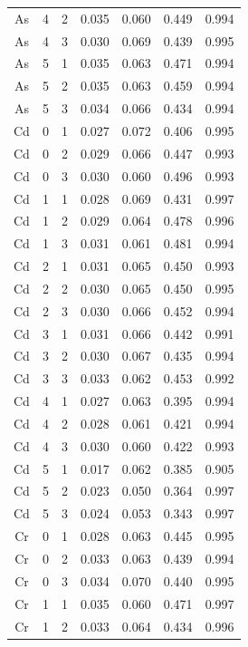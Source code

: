 \documentclass[ms, hidelinks]{uncgdissertationexp}
\theoremstyle{plain}
\theoremstyle{definition}
\theoremstyle{remark}
\begin{document}
\begin{longtable}{ccccccc}
As & 4 & 2 & 0.035 & 0.060 & 0.449 & 0.994\\
\rowcolor{gray!6}  As & 4 & 3 & 0.030 & 0.069 & 0.439 & 0.995\\
As & 5 & 1 & 0.035 & 0.063 & 0.471 & 0.994\\
\rowcolor{gray!6}  As & 5 & 2 & 0.035 & 0.063 & 0.459 & 0.994\\
As & 5 & 3 & 0.034 & 0.066 & 0.434 & 0.994\\
\rowcolor{gray!6}  Cd & 0 & 1 & 0.027 & 0.072 & 0.406 & 0.995\\
Cd & 0 & 2 & 0.029 & 0.066 & 0.447 & 0.993\\
\rowcolor{gray!6}  Cd & 0 & 3 & 0.030 & 0.060 & 0.496 & 0.993\\
Cd & 1 & 1 & 0.028 & 0.069 & 0.431 & 0.997\\
\rowcolor{gray!6}  Cd & 1 & 2 & 0.029 & 0.064 & 0.478 & 0.996\\
Cd & 1 & 3 & 0.031 & 0.061 & 0.481 & 0.994\\
\rowcolor{gray!6}  Cd & 2 & 1 & 0.031 & 0.065 & 0.450 & 0.993\\
Cd & 2 & 2 & 0.030 & 0.065 & 0.450 & 0.995\\
\rowcolor{gray!6}  Cd & 2 & 3 & 0.030 & 0.066 & 0.452 & 0.994\\
Cd & 3 & 1 & 0.031 & 0.066 & 0.442 & 0.991\\
\rowcolor{gray!6}  Cd & 3 & 2 & 0.030 & 0.067 & 0.435 & 0.994\\
Cd & 3 & 3 & 0.033 & 0.062 & 0.453 & 0.992\\
\rowcolor{gray!6}  Cd & 4 & 1 & 0.027 & 0.063 & 0.395 & 0.994\\
Cd & 4 & 2 & 0.028 & 0.061 & 0.421 & 0.994\\
\rowcolor{gray!6}  Cd & 4 & 3 & 0.030 & 0.060 & 0.422 & 0.993\\
Cd & 5 & 1 & 0.017 & 0.062 & 0.385 & 0.905\\
\rowcolor{gray!6}  Cd & 5 & 2 & 0.023 & 0.050 & 0.364 & 0.997\\
Cd & 5 & 3 & 0.024 & 0.053 & 0.343 & 0.997\\
\rowcolor{gray!6}  Cr & 0 & 1 & 0.028 & 0.063 & 0.445 & 0.995\\
Cr & 0 & 2 & 0.033 & 0.063 & 0.439 & 0.994\\
\rowcolor{gray!6}  Cr & 0 & 3 & 0.034 & 0.070 & 0.440 & 0.995\\
Cr & 1 & 1 & 0.035 & 0.060 & 0.471 & 0.997\\
\rowcolor{gray!6}  Cr & 1 & 2 & 0.033 & 0.064 & 0.434 & 0.996\\

\end{longtable}
\end{document}
